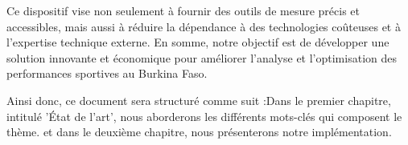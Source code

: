   Ce dispositif vise non seulement à fournir des outils de mesure précis et accessibles, mais aussi à réduire la dépendance à des technologies coûteuses et à l'expertise technique externe. En somme, notre objectif est de développer une solution innovante et économique pour améliorer l'analyse et l'optimisation des performances sportives au Burkina Faso.
  
  Ainsi donc, ce document sera structuré comme suit :Dans le premier chapitre, intitulé 'État de l'art', nous aborderons les différents mots-clés qui composent le thème.
  et dans le deuxième chapitre, nous présenterons notre implémentation.
  
  
  
  
  
  
  
